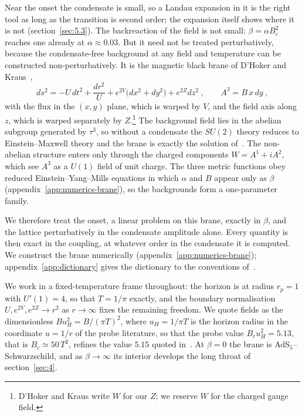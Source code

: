Near the onset the condensate is small, so a Landau expansion in it is
the right tool as long as the transition is second order; the expansion
itself shows where it is not (section~\ref{sec:5.3}). The backreaction of
the field is not small: $\beta = \alpha B_c^2$ reaches one already at $\alpha \approx 0.03$.
But it need not be treated perturbatively, because the condensate-free
background at any field and temperature can be constructed
non-perturbatively. It is the
magnetic black brane of D'Hoker and Kraus~\cite{DHoker:2009mmn,DHoker:2009ixq},
\begin{equation}
ds^2 = -U\,dt^2 + \frac{dr^2}{U} + e^{2V}\big(dx^2 + dy^2\big) + e^{2Z}dz^2~, \qquad
A^3 = B\,x\,dy~,
\end{equation}
with the flux in the $(x,y)$ plane, which is warped by $V$, and the field
axis along $z$, which is warped separately by $Z$.\footnote{D'Hoker and Kraus write $W$ for our $Z$; we reserve $W$ for the charged gauge field.}
The background field lies in the abelian subgroup generated by $\tau^3$,
so without a condensate the $SU(2)$ theory reduces to Einstein--Maxwell
theory and the brane is exactly the solution of~\cite{DHoker:2009mmn}. The
non-abelian structure enters only through the charged components
$W = A^1 + iA^2$, which see $A^3$ as a $U(1)$ field of unit charge. The
three metric functions obey reduced Einstein--Yang--Mills equations in
which $\alpha$ and $B$ appear only as $\beta$
(appendix~\ref{app:numerics-brane}), so the backgrounds form a
one-parameter family.

We therefore treat the onset, a linear problem on this brane, exactly in
$\beta$, and the lattice perturbatively in the condensate amplitude alone.
Every quantity is then exact in the coupling, at whatever order in the
condensate it is computed. We construct the brane numerically
(appendix~\ref{app:numerics-brane}); appendix~\ref{app:dictionary} gives
the dictionary to the conventions of~\cite{DHoker:2009mmn}.

We work in a fixed-temperature frame throughout: the horizon is at radius
$r_p = 1$ with $U'(1) = 4$, so that $T = 1/\pi$ exactly, and the boundary
normalisation $U, e^{2V}, e^{2Z} \to r^2$ as $r \to \infty$ fixes the
remaining freedom. We quote fields as the dimensionless
$B u_H^2 = B/(\pi T)^2$, where $u_H = 1/\pi T$ is the horizon radius in the
coordinate $u = 1/r$ of the probe literature, so that the probe value
$B_c u_H^2 = 5.13$, that is $B_c \simeq 50\,T^2$, refines the value $5.15$
quoted in~\cite{Ammon:2011je}. At $\beta = 0$ the brane is
AdS$_5$--Schwarzschild, and as $\beta \to \infty$ its interior develops the
long throat of section~\ref{sec:4}.

